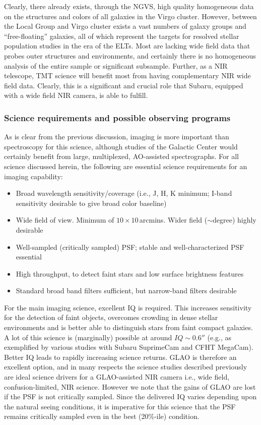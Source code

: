 Clearly, there already exists, through the NGVS, high quality
homogeneous data on the structures and colors of all galaxies in the
Virgo cluster. However, between the Local Group and Virgo cluster exists
a vast numbers of galaxy groups and ``free-floating'' galaxies, all of
which represent the targets for resolved stellar population studies in
the era of the ELTs. Most are lacking wide field data that probes outer
structures and environments, and certainly there is no homogeneous
analysis of the entire sample or significant subsample. Further, as a
NIR telescope, TMT science will benefit most from having complementary
NIR wide field data. Clearly, this is a significant and crucial role
that Subaru, equipped with a wide field NIR camera, is able to fulfill. 

\subsubsection{Science requirements and possible observing programs}


As is clear from the previous discussion, imaging is more important than
spectroscopy for this science, although studies of the Galactic Center
would certainly benefit from large, multiplexed, AO-assisted
spectrographs. For all science discussed herein, the following are
essential science requirements for an imaging capability: 

\begin{itemize}
\item Broad wavelength sensitivity/coverage (i.e., J, H, K minimum;
      I-band sensitivity desirable to give broad color baseline) 
\item Wide field of view. Minimum of $10 \times 10$\,arcmins. Wider
      field ($\sim$degree) highly desirable 
\item Well-sampled (critically sampled) PSF; stable and
      well-characterized PSF essential 
\item High throughput, to detect faint stars and low surface brightness
      features 
\item Standard broad band filters sufficient, but narrow-band filters
      desirable 
\end{itemize}


For the main imaging science, excellent IQ is required. This increases
sensitivity for the detection of faint objects,  overcomes crowding in
dense stellar environments and is better able to distinguish stars from
faint compact galaxies. A lot of this science is (marginally) possible
at around $IQ\sim0.6''$ (e.g., as exemplified by various studies with
Subaru SuprimeCam and CFHT MegaCam). Better IQ leads to rapidly
increasing science returns. GLAO is therefore an excellent option, and
in many respects the science studies described previously are ideal
science drivers for a GLAO-assisted NIR camera i.e., wide field,
confusion-limited, NIR science. However we note that the gains of GLAO
are lost if the PSF is not critically sampled. Since the delivered IQ
varies depending upon the natural seeing conditions, it is imperative
for this science that the PSF remains critically sampled even in the
best (20\%-ile) condition. 

